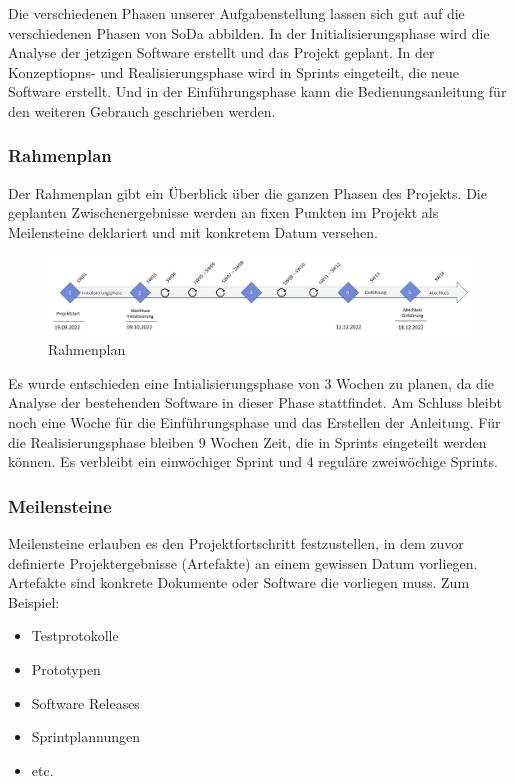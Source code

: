 \documentclass[a4paper, table]{article}
\begin{document}
Die verschiedenen Phasen unserer Aufgabenstellung lassen sich gut auf die verschiedenen Phasen von SoDa abbilden.
In der Initialisierungsphase wird die Analyse der jetzigen Software erstellt und das Projekt geplant.
In der Konzeptiopns- und Realisierungsphase wird in Sprints eingeteilt, die neue Software erstellt.
Und in der Einführungsphase kann die Bedienungsanleitung für den weiteren Gebrauch geschrieben werden.

\subsubsection{Rahmenplan}
Der Rahmenplan gibt ein Überblick über die ganzen Phasen des Projekts.
Die geplanten Zwischenergebnisse werden an fixen Punkten im Projekt als Meilensteine deklariert und mit konkretem Datum versehen.

\begin{figure}[h]
    \centering
    \hspace*{-2cm}
    \includegraphics[width=1.3\textwidth]{img/Rahmenplan.jpg}
    \caption{Rahmenplan}
    \label{fig:Rahmenplan}
\end{figure}
Es wurde entschieden eine Intialisierungsphase von 3 Wochen zu planen, da die Analyse der bestehenden Software in dieser Phase stattfindet.
Am Schluss bleibt noch eine Woche für die Einführungsphase und das Erstellen der Anleitung.
Für die Realisierungsphase bleiben 9 Wochen Zeit, die in Sprints eingeteilt werden können.
Es verbleibt ein einwöchiger Sprint und 4 reguläre zweiwöchige Sprints.

\subsubsection*{Meilensteine}
Meilensteine erlauben es den Projektfortschritt festzustellen,
in dem zuvor definierte Projektergebnisse (Artefakte) an einem gewissen Datum vorliegen.\\
Artefakte sind konkrete Dokumente oder Software die vorliegen muss. Zum Beispiel:
\begin{itemize}
    \item Testprotokolle
    \item Prototypen
    \item Software Releases
    \item Sprintplannungen
    \item etc.
\end{itemize}
\end{document}
